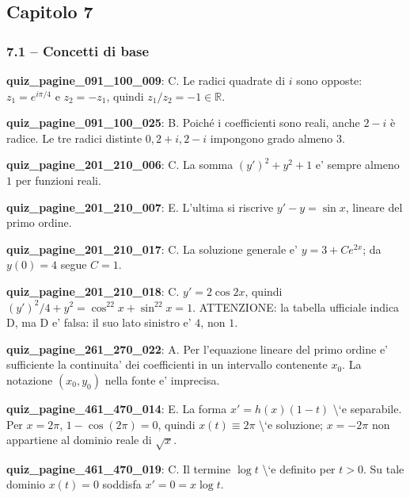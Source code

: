 \documentclass[11pt,a4paper]{article}
\newcounter{quiz}
\begin{document}
\subsection*{Capitolo 7}
\subsubsection*{7.1 -- Concetti di base}
\noindent\textbf{quiz\_pagine\_091\_100\_009}: C. Le radici quadrate di $i$ sono opposte: $z_1=e^{i\pi/4}$ e $z_2=-z_1$, quindi $z_1/z_2=-1\in\mathbb R$.\par\medskip
\noindent\textbf{quiz\_pagine\_091\_100\_025}: B. Poiché i coefficienti sono reali, anche $2-i$ è radice. Le tre radici distinte $0,2+i,2-i$ impongono grado almeno $3$.\par\medskip
\noindent\textbf{quiz\_pagine\_201\_210\_006}: C. La somma $(y')^2+y^2+1$ e' sempre almeno $1$ per funzioni reali.\par\medskip
\noindent\textbf{quiz\_pagine\_201\_210\_007}: E. L'ultima si riscrive $y'-y=\sin x$, lineare del primo ordine.\par\medskip
\noindent\textbf{quiz\_pagine\_201\_210\_017}: C. La soluzione generale e' $y=3+Ce^{2x}$; da $y(0)=4$ segue $C=1$.\par\medskip
\noindent\textbf{quiz\_pagine\_201\_210\_018}: C. $y'=2\cos2x$, quindi $(y')^2/4+y^2=\cos^22x+\sin^22x=1$. ATTENZIONE: la tabella ufficiale indica D, ma D e' falsa: il suo lato sinistro e' $4$, non $1$.\par\medskip
\noindent\textbf{quiz\_pagine\_261\_270\_022}: A. Per l'equazione lineare del primo ordine e' sufficiente la continuita' dei coefficienti in un intervallo contenente $x_0$. La notazione $(x_0,y_0)$ nella fonte e' imprecisa.\par\medskip
\noindent\textbf{quiz\_pagine\_461\_470\_014}: E. La forma $x\prime=h(x)(1-t)$ \textbackslash{}`e separabile. Per $x=2\pi$, $1-\cos(2\pi)=0$, quindi $x(t)\equiv2\pi$ \textbackslash{}`e soluzione; $x=-2\pi$ non appartiene al dominio reale di $\sqrt{x}$.\par\medskip
\noindent\textbf{quiz\_pagine\_461\_470\_019}: C. Il termine $\log t$ \textbackslash{}`e definito per $t>0$. Su tale dominio $x(t)=0$ soddisfa $x\prime=0=x\log t$.\par\medskip
\end{document}
